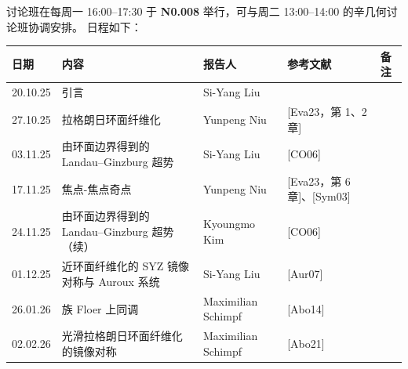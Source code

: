 讨论班在每周一 16:00--17:30 于 \textbf{N0.008} 举行，可与周二 13:00--14:00 的辛几何讨论班协调安排。
日程如下：


\begin{table}[htbp]
\centering
\footnotesize
\setlength{\tabcolsep}{3pt}
\begin{tabular}{@{}lp{4.7cm}lp{4.0cm}l@{}}
\toprule
日期 & 内容 & 报告人 & 参考文献 & 备注 \\
\midrule
20.10.25 & 引言 & Si-Yang Liu & & \\
27.10.25 & 拉格朗日环面纤维化 & Yunpeng Niu & [Eva23，第 1、2 章] & \\
03.11.25 & 由环面边界得到的 Landau--Ginzburg 超势 & Si-Yang Liu & [CO06] & \\
17.11.25 & 焦点-焦点奇点 & Yunpeng Niu & [Eva23，第 6 章]、[Sym03] & \\
24.11.25 & 由环面边界得到的 Landau--Ginzburg 超势（续） & Kyoungmo Kim & [CO06] & \\
01.12.25 & 近环面纤维化的 SYZ 镜像对称与 Auroux 系统 & Si-Yang Liu & [Aur07] & \\
26.01.26 & 族 Floer 上同调 & Maximilian Schimpf & [Abo14] & \\
02.02.26 & 光滑拉格朗日环面纤维化的镜像对称 & Maximilian Schimpf & [Abo21] & \\
\bottomrule
\end{tabular}
\end{table}


